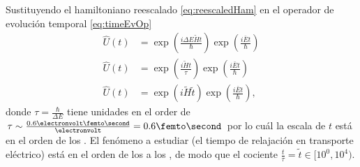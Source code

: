 Sustituyendo el hamiltoniano reescalado \eqref{eq:reescaledHam} en el operador de evolución temporal \eqref{eq:timeEvOp}
\begin{align*}
	\hat{U}(t) &= \exp({\frac{i\Delta E\tilde{H}t}\hbar}) \exp(\frac{i\bar E t}\hbar) \\
	\hat{U}(t) &= \exp({\frac{i\tilde{H}t}\tau}) \exp(\frac{i\bar E t}\hbar)\\
	\hat{U}(t) &= \exp(i\tilde{H}\tilde t) \exp(\frac{i\bar E t}\hbar),
\end{align*}
donde $\tau = \frac\hbar{\Delta E}$ tiene unidades en el order de 
$\tau \sim \frac{0.6 \electronvolt\femto\second}{\electronvolt} = 0.6\femto\second$ 
por lo cuál la escala de $t$ está en el orden de los \femto\second. El fenómeno a estudiar 
(el tiempo de relajación en transporte eléctrico) está en el orden de los 
\femto\second{} a los \pico\second{} \autocite{Fan2018}, de modo que el cociente 
$\frac{t}{\tau} = \tilde{t} \in [10^0, 10^4)$.

